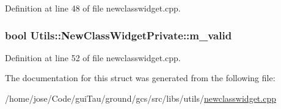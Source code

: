 Definition at line 48 of file newclasswidget.\-cpp.

\hypertarget{struct_utils_1_1_new_class_widget_private_a0a15874cfaa308a9c4d6b476ec89cae6}{
\subsubsection[{m\-\_\-valid}]{\setlength{\rightskip}{0pt plus 5cm}bool Utils\-::\-New\-Class\-Widget\-Private\-::m\-\_\-valid}}\label{struct_utils_1_1_new_class_widget_private_a0a15874cfaa308a9c4d6b476ec89cae6}


Definition at line 52 of file newclasswidget.\-cpp.



The documentation for this struct was generated from the following file\-:\begin{DoxyCompactItemize}
\item 
/home/jose/\-Code/gui\-Tau/ground/gcs/src/libs/utils/\hyperlink{newclasswidget_8cpp}{newclasswidget.\-cpp}\end{DoxyCompactItemize}
